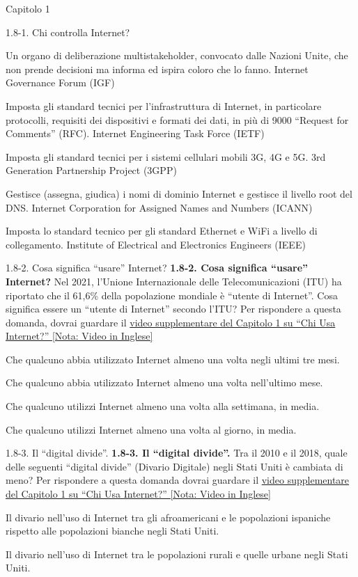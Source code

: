 \documentclass[a4paper]{article}
\begin{document}
\begin{quiz}{Capitolo 1}
\begin{matching}[points=1,shuffle=true]{1.8-1. Chi controlla Internet?}
\item Un organo di deliberazione multistakeholder, convocato dalle Nazioni Unite, che non prende decisioni ma informa ed ispira coloro che lo fanno. \answer Internet Governance Forum (IGF)
\item Imposta gli standard tecnici per l'infrastruttura di Internet, in particolare protocolli, requisiti dei dispositivi e formati dei dati, in più di 9000 ``Request for Comments'' (RFC). \answer Internet Engineering Task Force (IETF)
\item Imposta gli standard tecnici per i sistemi cellulari mobili 3G, 4G e 5G. \answer 3rd Generation Partnership Project (3GPP)
\item Gestisce (assegna, giudica) i nomi di dominio Internet e gestisce il livello root del DNS. \answer Internet Corporation for Assigned Names and Numbers (ICANN)
\item Imposta lo standard tecnico per gli standard Ethernet e WiFi a livello di collegamento. \answer Institute of Electrical and Electronics Engineers (IEEE)
\end{matching}

\begin{multi}[points=1,shuffle=true]{1.8-2. Cosa significa ``usare'' Internet?}
\textbf{1.8-2. Cosa significa ``usare'' Internet?} 
Nel 2021, l'Unione Internazionale delle Telecomunicazioni (ITU) ha riportato che il 61,6\% della popolazione mondiale è ``utente di Internet''. Cosa significa essere un ``utente di Internet'' secondo l'ITU? 
Per rispondere a questa domanda, dovrai guardare il \href{https://www.youtube.com/watch?v=-YaGGf8C1A4}{video supplementare del Capitolo 1 su ``Chi Usa Internet?'' [Nota: Video in Inglese]}
\item* Che qualcuno abbia utilizzato Internet almeno una volta negli ultimi tre mesi.
\item Che qualcuno abbia utilizzato Internet almeno una volta nell'ultimo mese.
\item Che qualcuno utilizzi Internet almeno una volta alla settimana, in media.
\item Che qualcuno utilizzi Internet almeno una volta al giorno, in media.
\end{multi}

\begin{multi}[points=1,shuffle=true]{1.8-3. Il ``digital divide''.}
\textbf{1.8-3. Il ``digital divide''.} 
Tra il 2010 e il 2018, quale delle seguenti ``digital divide'' (Divario Digitale) negli Stati Uniti è cambiata di meno?
Per rispondere a questa domanda dovrai guardare il \href{https://www.youtube.com/watch?v=-YaGGf8C1A4}{video supplementare del Capitolo 1 su ``Chi Usa Internet?'' [Nota: Video in Inglese]}
\item* Il divario nell'uso di Internet tra gli afroamericani e le popolazioni ispaniche rispetto alle popolazioni bianche negli Stati Uniti.
\item Il divario nell'uso di Internet tra le popolazioni rurali e quelle urbane negli Stati Uniti.
\end{multi}

\end{quiz}
\end{document}
